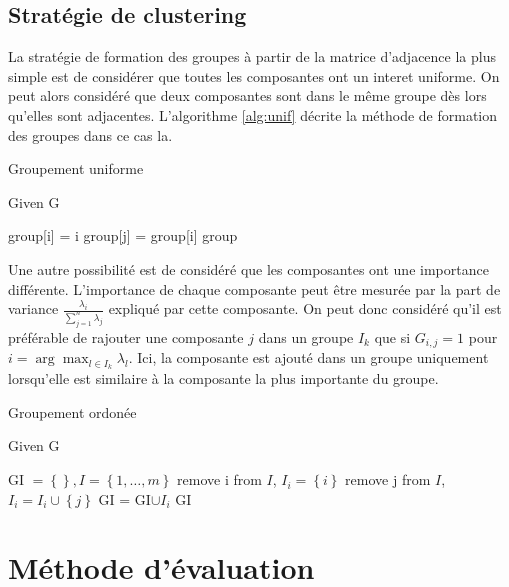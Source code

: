 \documentclass{gretsi}
\newcommand{\set}[1]{\left \{ 1, \dots, #1 \right \}}
\begin{document}
        

\subsection{Stratégie de clustering}
\label{sub:clust}

La stratégie de formation des groupes à partir de la matrice d'adjacence la plus simple est de considérer que toutes les composantes ont un interet uniforme. On peut alors considéré que deux composantes sont dans le même groupe dès lors qu'elles sont adjacentes. L'algorithme \ref{alg:unif} décrite la méthode de formation des groupes dans ce cas la.\\

\begin{algorithm}
\caption{Groupement uniforme}\label{alg:unif}
Given G
\begin{algorithmic}[1]
\State group[i] = i
\EndFor
{}
 group[j] = group[i]
\EndIf
\EndFor
\EndFor
\State \Return group
\end{algorithmic}
\end{algorithm}

Une autre possibilité est de considéré que les composantes ont une importance différente. L'importance de chaque composante peut être mesurée par la part de variance $\frac{\lambda_i}{\sum_{j=1}^n \lambda_j}$ expliqué par cette composante. On peut donc considéré qu'il est préférable de rajouter une composante $j$ dans un groupe $I_k$ que si $G_{i, j} = 1$ pour $i = \arg\max_{l \in I_k} \lambda_l$. Ici, la composante est ajouté dans un groupe uniquement lorsqu'elle est similaire à la composante la plus importante du groupe.

\begin{algorithm}
\caption{Groupement ordonée}\label{alg:ord}
Given G
\begin{algorithmic}[1]
\State GI $= \left \{  \right \}, I = \set{m}$
\State remove i from $I$, $I_i = \left \{ i \right \}$
\State remove j from $I$, $I_i = I_i \cup \left \{ j \right \}$
\EndIf
\EndFor
\State GI = GI$ \cup I_i$
\EndFor
\State \Return GI
\end{algorithmic}
\end{algorithm}



\section{Méthode d'évaluation}
\label{sec:eval}
\end{document}
